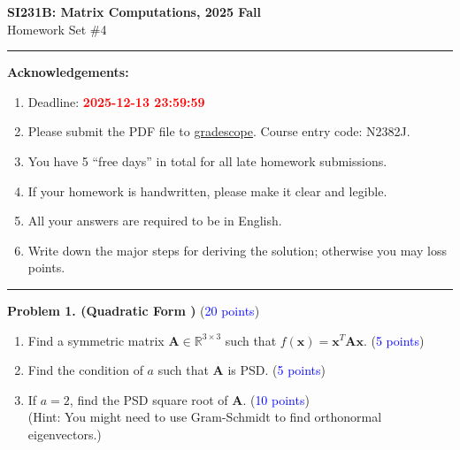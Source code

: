 \documentclass[english,onecolumn]{IEEEtran}
\newcommand{\0}{{\mathbf{0}}} %
\begin{document}
\begin{center}
	\textbf{\LARGE{SI231B: Matrix Computations, 2025 Fall}}\\
	{\Large Homework Set \#4}\\
\par\end{center}

\noindent
\rule{\linewidth}{0.4pt}
{\bf Acknowledgements:}
\begin{enumerate}
	\item Deadline: {\bf \textcolor{red}{2025-12-13 23:59:59}}
    \item Please submit the PDF file to \hyperlink{https://www.gradescope.com/}{gradescope}. Course entry code: N2382J.
    \item You have 5 ``free days'' in total for all late homework submissions.
    \item If your homework is handwritten, please make it clear and legible.
    \item All your answers are required to be in English. 
    \item Write down the major steps for deriving the solution; otherwise you may loss points.
\end{enumerate}
\rule{\linewidth}{0.4pt}


\newpage
\noindent \textbf{Problem 1. (Quadratic Form )} (\textcolor{blue}{20 points})

\begin{enumerate}
Consider the following function:
\[
f(\mathbf{x}) = 2x_1^2 + 2x_2^2 + ax_3^2 + 2x_1x_2+2x_1x_3+2x_2x_3
\]


    \item Find a symmetric matrix $\mathbf{A} \in \mathbb{R}^{3 \times 3}$ such that $f(\mathbf{x}) = \mathbf{x}^T \mathbf{A} \mathbf{x}$. (\textcolor{blue}{5 points})
    
    \item Find the condition of $a$ such that $\mathbf{A}$ is PSD. (\textcolor{blue}{5 points})
    
    \item If $a=2$, find the PSD square root of $\mathbf{A}$. (\textcolor{blue}{10 points})\\(Hint: You might need to use Gram-Schmidt to find orthonormal eigenvectors.)

\end{enumerate}
\end{document}
